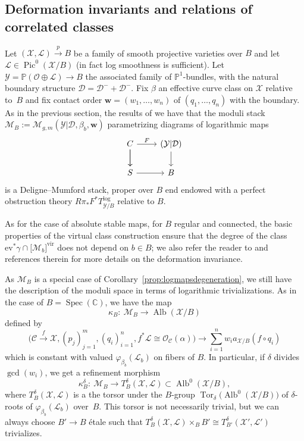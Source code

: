 \documentclass[11pt]{article}
\numberwithin{equation}{section}
\newcommand{\vir}[1]{\big[#1\big]^\mathrm{vir}}
\newcommand{\ev}{\mathrm{ev}}
\newcommand{\Pic}{\operatorname{Pic}}
\newcommand{\Alb}{\operatorname{Alb}}
\newcommand{\bfw}{ {\boldsymbol w} }
\newcommand{\D}{\mathcal{D}}
\renewcommand{\L}{\mathcal{L}}
\newcommand{\M}{\mathcal{M}}
\newcommand{\X}{\mathcal{X}}
\newcommand{\C}{\mathcal{C}}
\renewcommand{\O}{\mathcal{O}}
\newcommand{\Y}{\mathcal{Y}}
\numberwithin{equation}{section}
\theoremstyle{definition}
\begin{document}
\subsection{Deformation invariants and relations of correlated classes}
Let $(\X,\L)\xrightarrow{p} B$ be a family of smooth projective varieties over $B$ and let $\mathcal L\in \Pic^0(\mathcal X\slash B)$ (in fact log smoothness is sufficient).
Let $\Y=\mathbb P(\O\oplus\L)\to B$ the associated family of $\mathbb P^1$-bundles, with the natural boundary structure $\D=\mathcal D^- +\mathcal D^-$.
Fix $\beta$ an effective curve class on $\X$ relative to~$B$ and
fix contact order $\bfw=(w_1,\dots,w_n)$ of $(q_1,\dots,q_n)$ with the boundary.
As in the previous section, the results of \cite{abramovich2014stable,gross2013logarithmic,maulik2023logarithmic} we have that the moduli stack
$\M_B:=\M_{g, m}(\mathcal Y|\D,\beta_b, \bfw)$
parametrizing diagrams of logarithmic maps
\[
\begin{tikzcd}
C\ar[r,"F"]\ar[d]\ar[d] & (\mathcal Y|\mathcal{D})\ar[d]\\
S\ar[r] & B
\end{tikzcd}
\]
is a Deligne--Mumford stack, proper over $B$ end endowed with a perfect obstruction theory $R\pi_*F^*T^{\log}_{\mathcal Y\slash B}$ relative to $B$.

As for the case of absolute stable maps,
for $B$ regular and connected, the basic properties of the virtual class construction \cite{behrend1997intrinsic,manolache2012virtual} ensure that
the degree of the class $\ev^*\gamma\cap\vir{\M_b}$ does not depend on $b\in B$; we also refer the reader to \cite[Appendix~A]{mandel2020descendant} and references therein for more details on the deformation invariance.

As $\M_B$ is a special case of Corollary~\ref{prop:logmapsdegeneration}, we still have the description of the moduli space in terms of logarithmic trivializations. As in the case of $B=\operatorname{Spec}(\mathbb C)$, we have the map
\[\kappa_B\colon\ \M_B\to\Alb(\mathcal X\slash B)\]
defined by
\[\bigl(\C\xrightarrow{f}\X,(p_j)_{j=1}^m,(q_i)_{i=1}^n,f^*\L\cong\O_{\C}(\alpha)\bigr)\rightarrow \sum_{i=1}^n w_i a_{\X\slash B}(f\circ q_i)\]
which is constant with valued $\varphi_{\beta_b}(\L_b)$ on fibers of $B$. In particular, if $\delta$ divides $\gcd(w_i)$, we get a refinement morphism
\[\kappa^\delta_B\colon\ \M_B\longrightarrow T^\delta_B(\X,\L)\subset \Alb^0(\X/B),
\]
where $T^\delta_B(\X,\L)$ is a the torsor under the $B$-group $\operatorname{Tor}_{\delta}\bigl(\Alb^0(\mathcal X\slash B)\bigr)$ of $\delta$-roots of $\varphi_{\beta_b}(\L_b)$ over~$B$. This torsor is not necessarily trivial, but we can always choose $B'\to B$ \'etale such that $T^\delta_B(\X,\L)\times_B B'\cong T^\delta_{B'}(\X',\L')$ trivializes.
\end{document}
